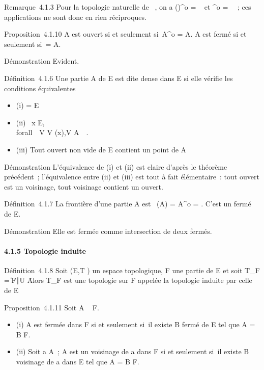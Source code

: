 \documentclass[]{article}
\begin{document}
Remarque~4.1.3 Pour la topologie naturelle de ~, on a
()^o = ~ et
^o = \varnothing~~; ces applications ne
sont donc en rien réciproques.

Proposition~4.1.10 A est ouvert si et seulement si~A^o = A. A
est fermé si et seulement si~\overlineA = A.

Démonstration Evident.

Définition~4.1.6 Une partie A de E est dite dense dans E si elle vérifie
les conditions équivalentes

\begin{itemize}
\itemsep1pt\parskip0pt
\item
  (i) \overlineA = E
\item
  (ii) \forall~x \in E, \\forall~~V \in
  V (x),\quad V \bigcap A\neq~\varnothing~.
\item
  (iii) Tout ouvert non vide de E contient un point de A
\end{itemize}

Démonstration L'équivalence de (i) et (ii) est claire d'après le
théorème précédent~; l'équivalence entre (ii) et (iii) est tout à fait
élémentaire~: tout ouvert est un voisinage, tout voisinage contient un
ouvert.

Définition~4.1.7 La frontière d'une partie A est
\mathrmFr~(A) =
\overlineA \diagdown A^o =
\overlineA \bigcap\overlinecA. C'est un
fermé de E.

Démonstration Elle est fermée comme intersection de deux fermés.

\paragraph{4.1.5 Topologie induite}

Définition~4.1.8 Soit (E,T ) un espace topologique, F une partie de E et
soit T_F = \U \bigcap F∣U
\inT\. Alors T_F est une topologie sur F appelée
la topologie induite par celle de E

Proposition~4.1.11 Soit A \subset~ F.

\begin{itemize}
\itemsep1pt\parskip0pt
\item
  (i) A est fermée dans F si et seulement si~il existe B fermé de E tel
  que A = B \bigcap F.
\item
  (ii) Soit a \in A~; A est un voisinage de a dans F si et seulement si~il
  existe B voisinage de a dans E tel que A = B \bigcap F.
\end{itemize}
\end{document}
